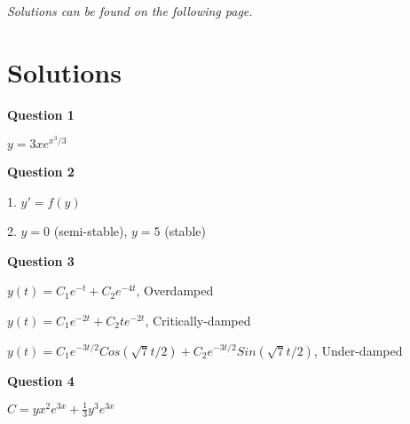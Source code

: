 \vspace{2cm}

\emph{Solutions can be found on the following page.}
\newpage

\section{Solutions}

\textbf{Question 1}

$y=3xe^{x^3/3}$

\textbf{Question 2}

1. $y'=f(y)$

2. $y=0$ (semi-stable), $y=5$ (stable)

\textbf{Question 3}

$y(t)=C_1 e^{-t} + C_2 e^{-4t}$, Overdamped

$y(t)=C_1 e^{-2t} + C_2 t e^{-2t}$, Critically-damped

$y(t)=C_1 e^{-3t/2} Cos(\sqrt{7}t/2) + C_2 e^{-3t/2} Sin(\sqrt{7}t/2)$, Under-damped

\textbf{Question 4}

$C = yx^2e^{3x} + \frac{1}{3} y^3 e^{3x}$
